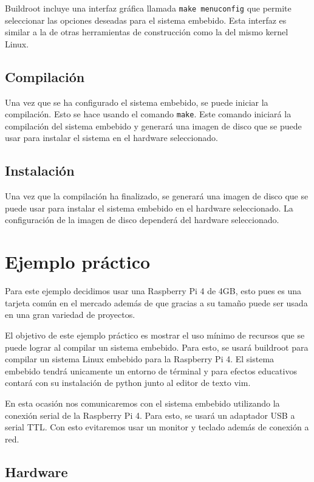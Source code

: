 \documentclass[12pt, letterpaper]{article}
\begin{document}
	Buildroot incluye una interfaz gráfica llamada \texttt{make menuconfig} que permite seleccionar las opciones deseadas para el sistema embebido. Esta interfaz es similar a la de otras herramientas de construcción como la del mismo kernel Linux.

	\subsection{Compilación}

	Una vez que se ha configurado el sistema embebido, se puede iniciar la compilación. Esto se hace usando el comando \texttt{make}. Este comando iniciará la compilación del sistema embebido y generará una imagen de disco que se puede usar para instalar el sistema en el hardware seleccionado.

	\subsection{Instalación}

	Una vez que la compilación ha finalizado, se generará una imagen de disco que se puede usar para instalar el sistema embebido en el hardware seleccionado. La configuración de la imagen de disco dependerá del hardware seleccionado.

	\section{Ejemplo práctico}

	Para este ejemplo decidimos usar una Raspberry Pi 4 de 4GB, esto pues es una tarjeta común en el mercado además de que gracias a su tamaño puede ser usada en una gran variedad de proyectos.

	El objetivo de este ejemplo práctico es mostrar el uso mínimo de recursos que se puede lograr al compilar un sistema embebido. Para esto, se usará buildroot para compilar un sistema Linux embebido para la Raspberry Pi 4. El sistema embebido tendrá unicamente un entorno de términal y para efectos educativos contará con su instalación de python junto al editor de texto vim.

	En esta ocasión nos comunicaremos con el sistema embebido utilizando la conexión serial de la Raspberry Pi 4. Para esto, se usará un adaptador USB a serial TTL. Con esto evitaremos usar un monitor y teclado además de conexión a red.

	\subsection{Hardware}
\end{document}
